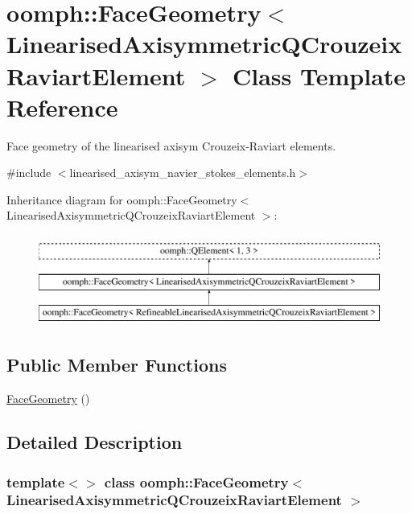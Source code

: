 \hypertarget{classoomph_1_1FaceGeometry_3_01LinearisedAxisymmetricQCrouzeixRaviartElement_01_4}{}\section{oomph\+:\+:Face\+Geometry$<$ Linearised\+Axisymmetric\+Q\+Crouzeix\+Raviart\+Element $>$ Class Template Reference}
\label{classoomph_1_1FaceGeometry_3_01LinearisedAxisymmetricQCrouzeixRaviartElement_01_4}


Face geometry of the linearised axisym Crouzeix-\/\+Raviart elements.  




{\ttfamily \#include $<$linearised\+\_\+axisym\+\_\+navier\+\_\+stokes\+\_\+elements.\+h$>$}

Inheritance diagram for oomph\+:\+:Face\+Geometry$<$ Linearised\+Axisymmetric\+Q\+Crouzeix\+Raviart\+Element $>$\+:\begin{figure}[H]
\begin{center}
\leavevmode
\includegraphics[height=3.000000cm]{classoomph_1_1FaceGeometry_3_01LinearisedAxisymmetricQCrouzeixRaviartElement_01_4}
\end{center}
\end{figure}
\subsection*{Public Member Functions}
\begin{DoxyCompactItemize}
\item 
\hyperlink{classoomph_1_1FaceGeometry_3_01LinearisedAxisymmetricQCrouzeixRaviartElement_01_4_a9b08bbd8da6f675ce64bb41d3a78a15a}{Face\+Geometry} ()
\end{DoxyCompactItemize}


\subsection{Detailed Description}
\subsubsection*{template$<$$>$\newline
class oomph\+::\+Face\+Geometry$<$ Linearised\+Axisymmetric\+Q\+Crouzeix\+Raviart\+Element $>$}

